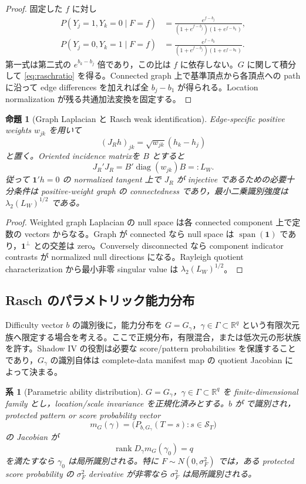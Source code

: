 \documentclass[11pt,a4paper]{ltjsarticle}
\newtheorem{proposition}{命題}[section]
\newtheorem{corollary}{系}[section]
\theoremstyle{remark}
\newcommand{\R}{\mathbb R}
\newcommand{\one}{\bm 1}
\newcommand{\cS}{\mathcal S}
\newcommand{\rank}{\operatorname{rank}}
\newcommand{\diag}{\operatorname{diag}}
\newcommand{\Span}{\operatorname{span}}
\begin{document}
\begin{proof}
固定した $f$ に対し
\begin{align*}
P(Y_j=1,Y_k=0\mid F=f)
&=\frac{e^{f-b_j}}
{(1+e^{f-b_j})(1+e^{f-b_k})},\\
P(Y_j=0,Y_k=1\mid F=f)
&=\frac{e^{f-b_k}}
{(1+e^{f-b_j})(1+e^{f-b_k})}.
\end{align*}
第一式は第二式の $e^{b_k-b_j}$ 倍であり，この比は $f$ に依存しない。$G$ に関して積分して \eqref{eq:raschratio} を得る。Connected graph 上で基準頂点から各頂点への path に沿って edge differences を加えれば全 $b_j-b_1$ が得られる。Location normalization が残る共通加法変換を固定する。
\end{proof}

\begin{proposition}[Graph Laplacian と Rasch weak identification]\label{prop:raschlaplacian}
Edge-specific positive weights $w_{jk}$ を用いて
\[
(J_Rh)_{jk}=\sqrt{w_{jk}}(h_k-h_j)
\]
と置く。Oriented incidence matrixを $B$ とすると
\[
J_R'J_R=B'\diag(w_{jk})B=:L_W.
\]
従って $\one'h=0$ の normalized tangent 上で $J_R$ が injective であるための必要十分条件は positive-weight graph の connectedness であり，最小二乗識別強度は $\lambda_2(L_W)^{1/2}$ である。
\end{proposition}

\begin{proof}
Weighted graph Laplacian の null space は各 connected component 上で定数の vectors からなる。Graph が connected なら null space は $\Span(\one)$ であり，$\one^\perp$ との交差は zero。Conversely disconnected なら component indicator contrasts が normalized null directions になる。Rayleigh quotient characterization から最小非零 singular value は $\lambda_2(L_W)^{1/2}$。
\end{proof}

\subsection{Rasch のパラメトリック能力分布}
Difficulty vector $b$ の識別後に，能力分布を $G=G_\gamma$，$\gamma\in\Gamma\subset\R^q$ という有限次元族へ限定する場合を考える。ここで正規分布，有限混合，または低次元の形状族を許す。Shadow IV の役割は必要な score/pattern probabilities を保護することであり，$G_\gamma$ の識別自体は complete-data manifest map の quotient Jacobian によって決まる。

\begin{corollary}[Parametric ability distribution]\label{cor:raschparamG}
$G=G_\gamma$，$\gamma\in\Gamma\subset\R^q$ を finite-dimensional family とし，location/scale invariance を正規化済みとする。$b$ が  で識別され，protected pattern or score probability vector
\[
m_G(\gamma)=\bigl(P_{b,G_\gamma}(T=s):s\in\cS_T\bigr)
\]
の Jacobian が
\[
\rank D_\gamma m_G(\gamma_0)=q
\]
を満たすなら $\gamma_0$ は局所識別される。特に $F\sim N(0,\sigma_F^2)$ では，ある protected score probability の $\sigma_F^2$ derivative が非零なら $\sigma_F^2$ は局所識別される。
\end{corollary}
\end{document}

